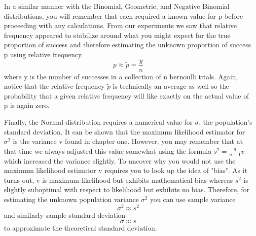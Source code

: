 \documentclass[10pt,]{book}
\numberwithin{equation}{section}
\begin{document}
\par
\hypertarget{p-1337}{}%
In a similar manner with the Binomial, Geometric, and Negative Binomial distributions, you will remember that each required a known value for p before  proceeding with any calculations. From our experiments we saw that relative frequency appeared to stabilize around what you might expect for the true proportion of success and therefore estimating the unknown proportion of success p using relative frequency%
\begin{equation*}
p \approx \tilde{p} = \frac{y}{n}
\end{equation*}
where y is the number of successes in a collection of n bernoulli trials. Again, notice that the relative frequency \(\tilde{p}\) is technically an average as well so the probability that a given relative frequency will like exactly on the actual value of p is again zero.%
\par
\hypertarget{p-1338}{}%
Finally, the Normal distribution requires a numerical value for \(\sigma\), the population's standard deviation. It can be shown that the maximum likelihood estimator for \(\sigma^2\) is the variance v found in chapter one. However, you may remember that at that time we always adjusted this value somewhat using the formula \(s^2 = \frac{n}{n-1} v\) which increased the variance slightly. To uncover why you would not use the maximum likelihood estimator v requires you to look up the idea of "bias". As it turns out, v is maximum likelihood but exhibits mathematical bias whereas \(s^2\) is slightly suboptimal with respect to likelihood but exhibits no bias. Therefore, for estimating the unknown population variance \(\sigma^2\) you can use sample variance%
\begin{equation*}
\sigma^2 \approx s^2
\end{equation*}
and similarly sample standard deviation%
\begin{equation*}
\sigma \approx s
\end{equation*}
to approximate the theoretical standard deviation.%
%
%
\typeout{************************************************}
\typeout{************************************************}
%
\end{document}
